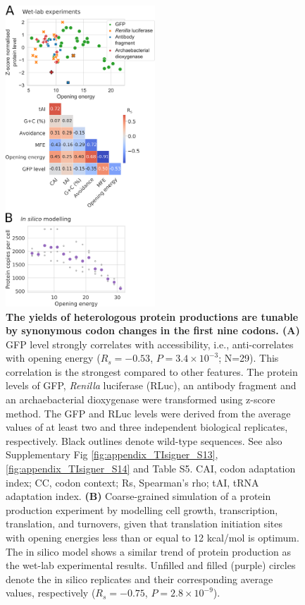 \begin{figure}
	\includegraphics[width=0.5\textwidth]{chapters/TIsigner/Figs/fig4.png}
	\caption[The yields of heterologous protein productions are tunable by synonymous codon changes in the first nine codons.]{\textbf{The yields of heterologous protein productions are tunable by synonymous codon changes in the first nine codons. (A)} GFP level strongly correlates with accessibility, i.e., anti-correlates with opening energy ($R_s=−0.53$, $P=3.4 \times 10^{−3}$; N=29). This correlation is the strongest compared to other features. The protein levels of GFP, \textit{Renilla} luciferase (RLuc), an antibody fragment and an archaebacterial dioxygenase were transformed using z-score method. The GFP and RLuc levels were derived from the average values of at least two and three independent biological replicates, respectively. Black outlines denote wild-type sequences. See also Supplementary Fig \ref{fig:appendix_TIsigner_S13}, \ref{fig:appendix_TIsigner_S14} and Table S5. CAI, codon adaptation index; CC, codon context; Rs, Spearman’s rho; tAI, tRNA adaptation index. \textbf{(B)} Coarse-grained simulation of a protein production experiment by modelling cell growth, transcription, translation, and turnovers, given that translation initiation sites with opening energies less than or equal to 12 kcal/mol is optimum. The in silico model shows a similar trend of protein production as the wet-lab experimental results. Unfilled and filled (purple) circles denote the in silico replicates and their corresponding average values, respectively ($R_s=−0.75$, $P=2.8\times 10^{−9}$).}
	\label{fig:tisigner_fig4}
\end{figure}



